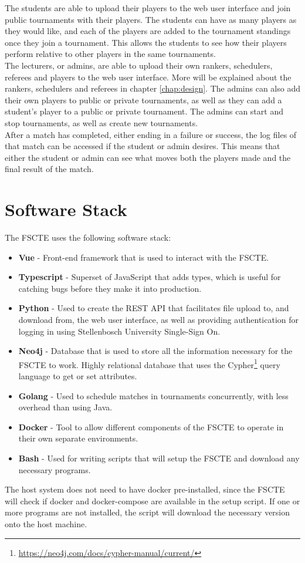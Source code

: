 \documentclass[a4paper, 12pt]{report}
\begin{document}
The students are able to upload their players to the web user interface and join
public tournaments with their players. The students can have as many players as
they would like, and each of the players are added to the tournament standings
once they join a tournament. This allows the students to see how their players
perform relative to other players in the same tournaments. \\

The lecturers, or admins, are able to upload their own rankers, schedulers,
referees and players to the web user interface. More will be explained about the
rankers, schedulers and referees in chapter \ref{chap:design}. The admins can
also add their own players to public or private tournaments, as well as they
can add a student's player to a public or private tournament. The admins can
start and stop tournaments, as well as create new tournaments. \\

After a match has completed, either ending in a failure or success, the log files
of that match can be accessed if the student or admin desires. This means that
either the student or admin can see what moves both the players made and the
final result of the match.

\section{Software Stack}

The FSCTE uses the following software stack:
\begin{itemize}
	\item \textbf{Vue} - Front-end framework that is used to interact with the
	FSCTE.
	\item \textbf{Typescript} - Superset of JavaScript that adds types, which
	is useful for catching bugs before they make it into production.
	\item \textbf{Python} - Used to create the REST API that facilitates
	file upload to, and download from, the web user interface, as well as providing
	authentication for logging in using Stellenbosch University Single-Sign On.
	\item \textbf{Neo4j} - Database that is used to store all the information
	necessary for the FSCTE to work. Highly relational database that uses the
	Cypher\footnote{\url{https://neo4j.com/docs/cypher-manual/current/}} query
	language to get or set attributes.
	\item \textbf{Golang} - Used to schedule matches in tournaments concurrently,
	with less overhead than using Java.
	\item \textbf{Docker} - Tool to allow different components of the FSCTE to
	operate in their own separate environments.
	\item \textbf{Bash} - Used for writing scripts that will setup the FSCTE and
	download any necessary programs.
\end{itemize}
The host system does not need to have docker pre-installed, since the FSCTE will
check if docker and docker-compose are available in the setup script. If one or
more programs are not installed, the script will download the necessary version
onto the host machine.
\end{document}
